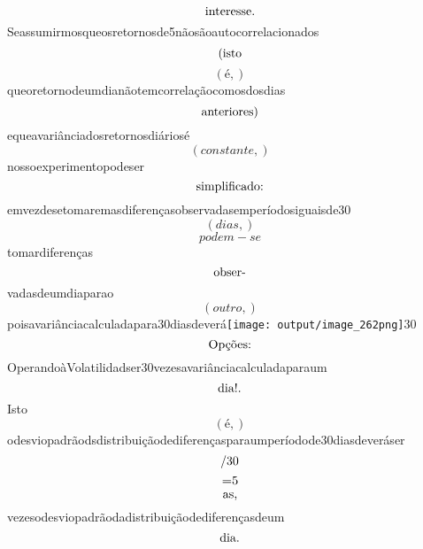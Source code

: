 \documentclass{article}
\begin{document}
\begin{equation}
$interesse.$
\end{equation}Seassumirmosqueosretornosde5nãosãoautocorrelacionados\begin{equation}
$(isto$
\end{equation}\begin{equation}
\left( é,\right)
\end{equation}queoretornodeumdianãotemcorrelaçãocomosdosdias\begin{equation}
$anteriores)$
\end{equation}equeavariânciadosretornosdiáriosé\begin{equation}
\left( constante,\right)
\end{equation}nossoexperimentopodeser\begin{equation}
$simplificado:$
\end{equation}emvezdesetomaremasdiferençasobservadasemperíodosiguaisde30\begin{equation}
\left( dias,\right)
\end{equation}\begin{equation}
podem - se
\end{equation}tomardiferenças\begin{equation}
$obser-$
\end{equation}vadasdeumdiaparao\begin{equation}
\left( outro,\right)
\end{equation}poisavariânciacalculadapara30diasdeverá\texttt{[image: output/image\_262png]}30\begin{equation}
$Opções:$
\end{equation}OperandoàVolatilidadser30vezesavariânciacalculadaparaum\begin{equation}
$dia!.$
\end{equation}Isto\begin{equation}
\left( é,\right)
\end{equation}odesviopadrãodsdistribuiçãodediferençasparaumperíodode30diasdeveráser\begin{equation}
$/30$
\end{equation}\begin{equation}
$=5$
\end{equation}\begin{equation}
$as,$
\end{equation}vezesodesviopadrãodadistribuiçãodediferençasdeum\begin{equation}
$dia.$
\end{equation}\begin{equation}

\end{equation}
\end{document}
